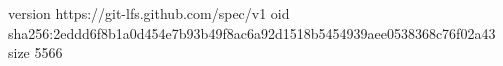version https://git-lfs.github.com/spec/v1
oid sha256:2eddd6f8b1a0d454e7b93b49f8ac6a92d1518b5454939aee0538368c76f02a43
size 5566
